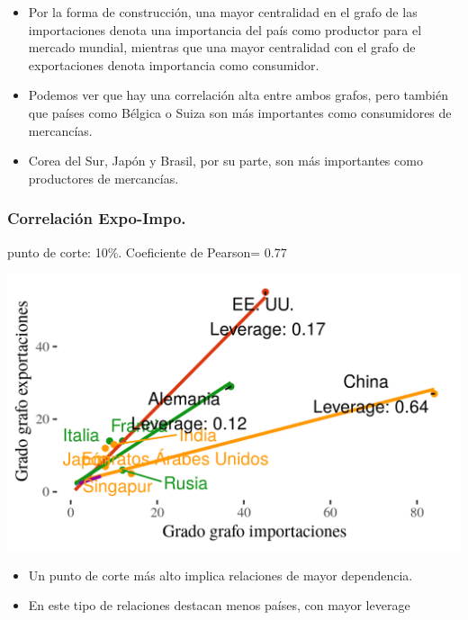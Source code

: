 \documentclass[compress]{beamer}
\begin{document}
\begin{frame}

\begin{itemize}
	\item[\faRebel] Por la forma de construcción, una mayor centralidad en el grafo de las importaciones denota una importancia del país como productor para el mercado mundial, mientras que una mayor centralidad con el grafo de exportaciones denota importancia como consumidor.
	\item[\faRebel] Podemos ver que hay una correlación alta entre ambos grafos, pero también que países como Bélgica o Suiza son más importantes como consumidores de mercancías.
	\item[\faRebel] Corea del Sur, Japón y Brasil, por su parte, son más importantes como productores de mercancías. 
\end{itemize}
\end{frame}


\begin{frame}
\frametitle{Correlación Expo-Impo.}

punto de corte: 10\%.
Coeficiente de Pearson= 0.77

\includegraphics[width=\linewidth]{Graficos/corr_grados_2016_10_pcnt}

\end{frame}

\begin{frame}

\begin{itemize}
	\item[\faRebel] Un punto de corte más alto implica relaciones de mayor dependencia.
	\item[\faRebel] En este tipo de relaciones destacan menos países, con mayor leverage 
\end{itemize}
\end{frame}
\end{document}
